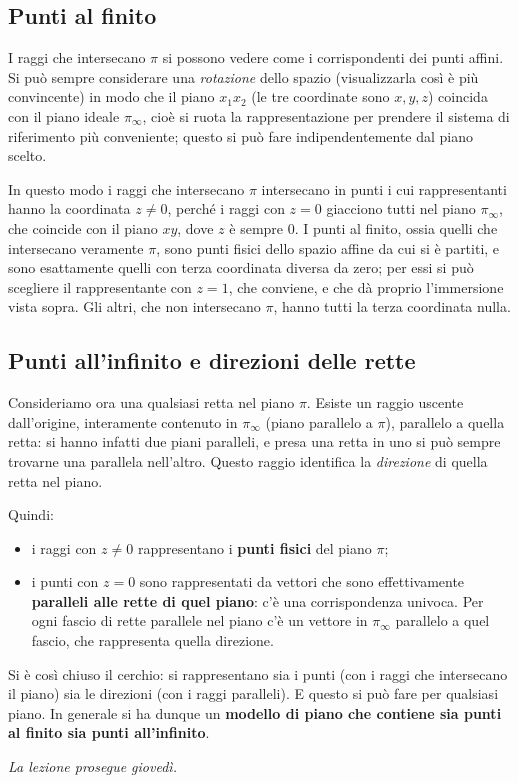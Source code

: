 \subsection{Punti al finito}

I raggi che intersecano $\pi$ si possono vedere come i corrispondenti dei punti affini. Si può sempre considerare una \emph{rotazione} dello spazio (visualizzarla così è più convincente) in modo che il piano $x_1x_2$ (le tre coordinate sono $x,y,z$) coincida con il piano ideale $\pi_\infty$, cioè si ruota la rappresentazione per prendere il sistema di riferimento più conveniente; questo si può fare indipendentemente dal piano scelto.

In questo modo i raggi che intersecano $\pi$ intersecano in punti i cui rappresentanti hanno la coordinata $z\neq 0$, perché i raggi con $z=0$ giacciono tutti nel piano $\pi_\infty$, che coincide con il piano $xy$, dove $z$ è sempre $0$. I punti al finito, ossia quelli che intersecano veramente $\pi$, sono punti fisici dello spazio affine da cui si è partiti, e sono esattamente quelli con terza coordinata diversa da zero; per essi si può scegliere il rappresentante con $z=1$, che conviene, e che dà proprio l'immersione vista sopra. Gli altri, che non intersecano $\pi$, hanno tutti la terza coordinata nulla.

\subsection{Punti all'infinito e direzioni delle rette}

Consideriamo ora una qualsiasi retta nel piano $\pi$. Esiste un raggio uscente dall'origine, interamente contenuto in $\pi_\infty$ (piano parallelo a $\pi$), parallelo a quella retta: si hanno infatti due piani paralleli, e presa una retta in uno si può sempre trovarne una parallela nell'altro. Questo raggio identifica la \emph{direzione} di quella retta nel piano.

Quindi:
\begin{itemize}
  \item i raggi con $z\neq 0$ rappresentano i \textbf{punti fisici} del piano $\pi$;
  \item i punti con $z=0$ sono rappresentati da vettori che sono effettivamente \textbf{paralleli alle rette di quel piano}: c'è una corrispondenza univoca. Per ogni fascio di rette parallele nel piano c'è un vettore in $\pi_\infty$ parallelo a quel fascio, che rappresenta quella direzione.
\end{itemize}

Si è così chiuso il cerchio: si rappresentano sia i punti (con i raggi che intersecano il piano) sia le direzioni (con i raggi paralleli). E questo si può fare per qualsiasi piano. In generale si ha dunque un \textbf{modello di piano che contiene sia punti al finito sia punti all'infinito}.

\medskip
\emph{La lezione prosegue giovedì.}


